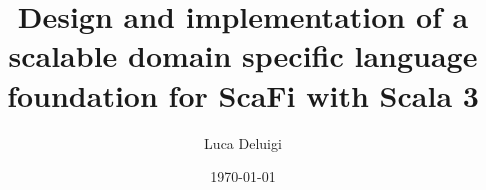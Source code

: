 \documentclass[12pt,a4paper,openright,twoside]{book}
\title{Design and implementation of a scalable domain specific language foundation for ScaFi with Scala 3}
\author{Luca Deluigi}
\date{\today}
\begin{document}
\frontmatter\frontispiece





\tableofcontents   
\listoffigures     %
\lstlistoflistings %

\mainmatter











\backmatter

\nocite{*} %



\end{document}
